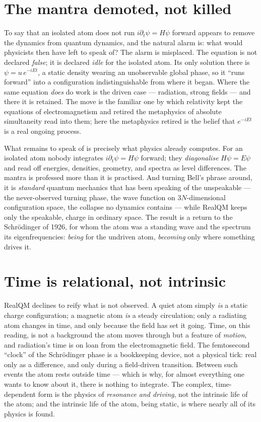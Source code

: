 \section{The mantra demoted, not killed}\label{sec:mantra}

To say that an isolated atom does not run $i\partial_t\psi = H\psi$ forward appears to remove the dynamics from
quantum dynamics, and the natural alarm is: what would physicists then have left to speak of? The alarm is
misplaced. The equation is not declared \emph{false}; it is declared \emph{idle} for the isolated atom. Its only
solution there is $\psi = u\,e^{-iEt}$, a static density wearing an unobservable global phase, so it ``runs
forward'' into a configuration indistinguishable from where it began. Where the same equation \emph{does} do work
is the driven case --- radiation, strong fields --- and there it is retained. The move is the familiar one by
which relativity kept the equations of electromagnetism and retired the metaphysics of absolute simultaneity read
into them; here the metaphysics retired is the belief that $e^{-iEt}$ is a real ongoing process.

What remains to speak of is precisely what physics already computes. For an isolated atom nobody integrates
$i\partial_t\psi = H\psi$ forward; they \emph{diagonalise} $H\psi = E\psi$ and read off energies, densities,
geometry, and spectra as level differences. The mantra is professed more than it is practised. And turning
Bell's phrase around, it is \emph{standard} quantum mechanics that has been speaking of the unspeakable --- the
never-observed turning phase, the wave function on $3N$-dimensional configuration space, the collapse no dynamics
contains --- while RealQM keeps only the speakable, charge in ordinary space. The result is a return to the
Schr\"odinger of 1926, for whom the atom was a standing wave and the spectrum its eigenfrequencies: \emph{being}
for the undriven atom, \emph{becoming} only where something drives it.

\section{Time is relational, not intrinsic}\label{sec:time-relational}

RealQM declines to reify what is not observed. A quiet atom simply \emph{is} a static charge configuration; a
magnetic atom \emph{is} a steady circulation; only a radiating atom changes in time, and only because the field
has set it going. Time, on this reading, is not a background the atom moves through but a feature of \emph{motion},
and radiation's time is on loan from the electromagnetic field. The femtosecond ``clock'' of the Schr\"odinger
phase is a bookkeeping device, not a physical tick: real only as a difference, and only during a field-driven
transition. Between such events the atom rests outside time --- which is why, for almost everything one wants to
know about it, there is nothing to integrate. The complex, time-dependent form is the physics of \emph{resonance
and driving}, not the intrinsic life of the atom; and the intrinsic life of the atom, being static, is where
nearly all of its physics is found.
